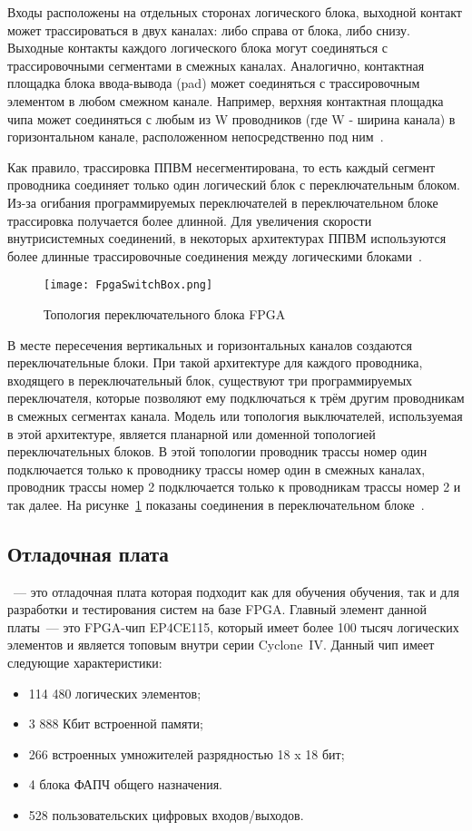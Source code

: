 Входы расположены на отдельных сторонах логического блока, выходной контакт может трассироваться в двух каналах: либо справа от блока, либо снизу. Выходные контакты каждого логического блока могут соединяться с трассировочными сегментами в смежных каналах. Аналогично, контактная площадка блока ввода-вывода (pad) может соединяться с трассировочным элементом в любом смежном канале. Например, верхняя контактная площадка чипа может соединяться с любым из W проводников (где W - ширина канала) в горизонтальном канале, расположенном непосредственно под ним~\cite{Wiki_FPGA}.

Как правило, трассировка ППВМ несегментирована, то есть каждый сегмент проводника соединяет только один логический блок с переключательным блоком. Из-за огибания программируемых переключателей в переключательном блоке трассировка получается более длинной. Для увеличения скорости внутрисистемных соединений, в некоторых архитектурах ППВМ используются более длинные трассировочные соединения между логическими блоками~\cite{Wiki_FPGA}.

\begin{figure}[ht]
	\centering
	\texttt{[image: FpgaSwitchBox.png]}  
	\caption{Топология переключательного блока FPGA}
	\label{fig:FpgaSwitchBox}
\end{figure}

В месте пересечения вертикальных и горизонтальных каналов создаются переключательные блоки. При такой архитектуре для каждого проводника, входящего в переключательный блок, существуют три программируемых переключателя, которые позволяют ему подключаться к трём другим проводникам в смежных сегментах канала. Модель или топология выключателей, используемая в этой архитектуре, является планарной или доменной топологией переключательных блоков. В этой топологии проводник трассы номер один подключается только к проводнику трассы номер один в смежных каналах, проводник трассы номер 2 подключается только к проводникам трассы номер 2 и так далее. На рисунке~\ref{fig:FpgaSwitchBox} показаны соединения в переключательном блоке~\cite{Wiki_FPGA}.

\subsection{Отладочная плата \boardname{}}
\boardname{}~--- это отладочная плата которая подходит как для обучения обучения, так и для разработки и тестирования систем на базе FPGA. Главный элемент данной платы~--- это FPGA-чип EP4CE115, который имеет более 100 тысяч логических элементов и является топовым внутри серии Cyclone~IV. Данный чип имеет следующие характеристики:
\begin{itemize}
	\item 114 480 логических элементов;
	\item 3 888 Кбит встроенной памяти;
	\item 266 встроенных умножителей разрядностью 18 x 18 бит;
	\item 4 блока ФАПЧ общего назначения.
	\item 528 пользовательских цифровых входов/выходов.
\end{itemize}


